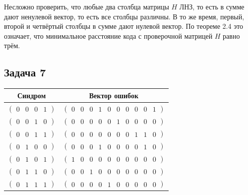 \documentclass{article}
\begin{document}
Несложно проверить, что любые два столбца матрицы $H$ ЛНЗ, то есть в сумме дают
ненулевой вектор, то есть все столбцы различны.
В то же время, первый, второй и четвёртый столбцы в сумме дают нулевой вектор.
По теореме 2.4 это означает, что минимальное расстояние кода с проверочной
матрицей $H$ равно трём.

\subsection{\texorpdfstring{Задача 7}{Task 7}}
\begin{table}[h]
    \centering
    \begin{tabular}{c c} \toprule
        Синдром & Вектор ошибок \\ \midrule
        $\begin{pmatrix}0&0&0&1\end{pmatrix}$&$\begin{pmatrix}0&0&0&1&0&0&0&0&0&1\end{pmatrix}$\\
        $\begin{pmatrix}0&0&1&0\end{pmatrix}$&$\begin{pmatrix}0&0&0&0&0&1&0&0&0&0\end{pmatrix}$\\
        $\begin{pmatrix}0&0&1&1\end{pmatrix}$&$\begin{pmatrix}0&0&0&0&0&0&0&1&1&0\end{pmatrix}$\\
        $\begin{pmatrix}0&1&0&0\end{pmatrix}$&$\begin{pmatrix}0&0&0&1&0&0&0&0&1&0\end{pmatrix}$\\
        $\begin{pmatrix}0&1&0&1\end{pmatrix}$&$\begin{pmatrix}1&0&0&0&0&0&0&0&0&0\end{pmatrix}$\\
        $\begin{pmatrix}0&1&1&0\end{pmatrix}$&$\begin{pmatrix}0&0&1&0&0&0&0&0&0&0\end{pmatrix}$\\
        $\begin{pmatrix}0&1&1&1\end{pmatrix}$&$\begin{pmatrix}0&0&0&0&1&0&0&0&0&0\end{pmatrix}$\\

\end{tabular}
\end{table}
\end{document}
